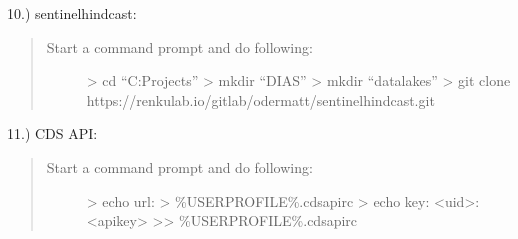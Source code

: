 \documentclass[letterpaper,10pt,english]{sphinxmanual}
\begin{document}
10.) sentinel\sphinxhyphen{}hindcast: 
\begin{quote}
\begin{description}
\item[{Start a command prompt and do following:}] \leavevmode
\textgreater{} cd “C:Projects”
\textgreater{} mkdir “DIAS”
\textgreater{} mkdir “datalakes”
\textgreater{} git clone https://renkulab.io/gitlab/odermatt/sentinel\sphinxhyphen{}hindcast.git

\end{description}
\end{quote}

11.) CDS API: 
\begin{quote}
\begin{description}
\item[{Start a command prompt and do following:}] \leavevmode
\textgreater{} echo url:  \textgreater{} \%USERPROFILE\%.cdsapirc
\textgreater{} echo key: \textless{}uid\textgreater{}:\textless{}api\sphinxhyphen{}key\textgreater{} \textgreater{}\textgreater{} \%USERPROFILE\%.cdsapirc

\end{description}
\end{quote}
\end{document}
